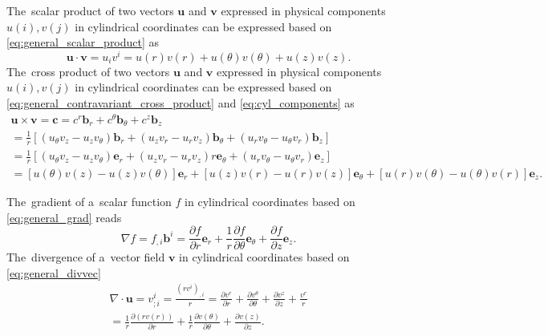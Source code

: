 \documentclass[review]{elsarticle}
\newcommand{\pdv}[2]{\frac{\partial{#1}}{\partial{#2}}}
\newcommand{\vect}[1]{\boldsymbol{#1}}
\begin{document}
The~scalar product of two vectors $\vect{u}$ and $\vect{v}$ expressed 
in physical components $u(i), v(j)$ in cylindrical coordinates can be expressed 
based on \eqref{eq:general_scalar_product} as
\begin{equation}
  \vect{u}\cdot\vect{v} = u_i v^i = u(r)v(r) + u(\theta)v(\theta) 
  + u(z)v(z) .
  \label{eq:cyl_scalar_product}
\end{equation}
The~cross product of two vectors $\vect{u}$ and $\vect{v}$ expressed 
in physical components $u(i), v(j)$ in cylindrical coordinates can be expressed 
based on \eqref{eq:general_contravariant_cross_product} 
and \eqref{eq:cyl_components} as
\begin{multline}
  \vect{u}\times\vect{v} = \vect{c} = c^r \vect{b}_r 
  + c^\theta \vect{b}_\theta + c^z \vect{b}_z \\
  = \frac{1}{r}\left[
  (u_\theta v_z - u_z v_\theta) \vect{b}_r 
  +  (u_z v_r - u_r v_z) \vect{b}_\theta
  +  (u_r v_\theta - u_\theta v_r)\vect{b}_z
  \right] \\
  = \frac{1}{r}\left[
  (u_\theta v_z - u_z v_\theta) \vect{e}_r 
  +  (u_z v_r - u_r v_z) r\vect{e}_\theta
  +  (u_r v_\theta - u_\theta v_r)\vect{e}_z
  \right] \\
 = [u(\theta) v(z) - u(z) v(\theta)] \vect{e}_r
 + [u(z) v(r) - u(r) v(z)] \vect{e}_\theta 
 + [u(r) v(\theta) - u(\theta) v(r)]\vect{e}_z .
 \label{eq:cyl_cross_product}
\end{multline}

The~gradient of a~scalar function $f$ in cylindrical coordinates based on 
\eqref{eq:general_grad} reads
\begin{equation}
  \nabla f = f_{,i}\vect{b}^i = \pdv{f}{r}\vect{e}_r 
  + \frac{1}{r}\pdv{f}{\theta}\vect{e}_{\theta} 
  + \pdv{f}{z}\vect{e}_z .
  \label{eq:cyl_gradf}
\end{equation}
The~divergence of a~vector field $\vect{v}$ in cylindrical coordinates based on
\eqref{eq:general_divvec}
\begin{multline}
  \nabla\cdot\vect{u} = v^i_{;i} = 
  \frac{(r v^i)_{,i}}{r}
  = \pdv{v^r}{r} + \pdv{v^\theta}{\theta} 
  + \pdv{v^z}{z} + \frac{v^r}{r} \\
  = \frac{1}{r}\pdv{(r v(r))}{r} + \frac{1}{r}\pdv{v(\theta)}{\theta} 
  + \pdv{v(z)}{z} .
  \label{eq:cyl_gradf}
\end{multline}
\end{document}
